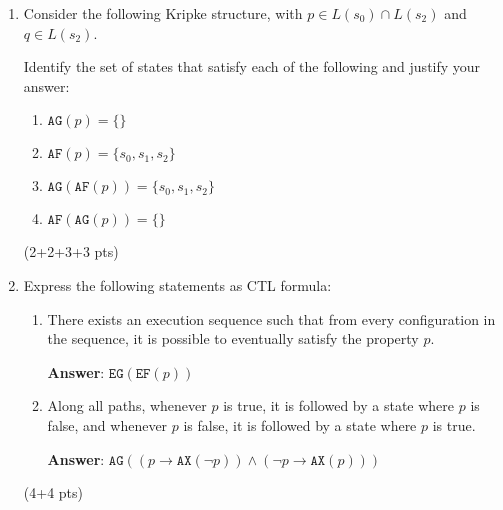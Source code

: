 \documentclass[11pt]{article}
\newcommand{\ax}[1]{\texttt{AX}(#1)}
\newcommand{\af}[1]{\texttt{AF}(#1)}
\newcommand{\ef}[1]{\texttt{EF}(#1)}
\newcommand{\ag}[1]{\texttt{AG}(#1)}
\newcommand{\eg}[1]{\texttt{EG}(#1)}
\begin{document}
\begin{enumerate}

\item
Consider the following Kripke structure, with $p\in L(s_0) \cap L(s_2)$ and
$q\in L(s_2)$.
\begin{center}
\end{center}
Identify the set of states that satisfy each of the following and justify your answer:
\begin{enumerate}
\item $\ag{p} =\{ \}$
\item $\af{p}= \{s_0, s_1, s_2\}$
\item $\ag{\af{p}} = \{s_0, s_1, s_2\}$
\item $\af{\ag{p}} = \{ \}$  
\end{enumerate}
\hfill(2+2+3+3 pts)

\item Express the following statements as CTL formula:
\begin{enumerate}

\item
  There exists an execution sequence such that from every configuration in the sequence,
  it is possible to eventually satisfy the property $p$.
  
\textbf{Answer}: $\eg{\ef{p}}$
\item
  Along all paths, whenever $p$ is true, it is followed by a state where $p$ is false, and
  whenever $p$ is false, it is followed by a state where $p$ is true.
  
\textbf{Answer}:  $\ag{(p\rightarrow \ax{\neg p}) \land (\neg p \rightarrow \ax{p})}$
\end{enumerate}
\hfill (4+4 pts)


\end{enumerate}
\end{document}
